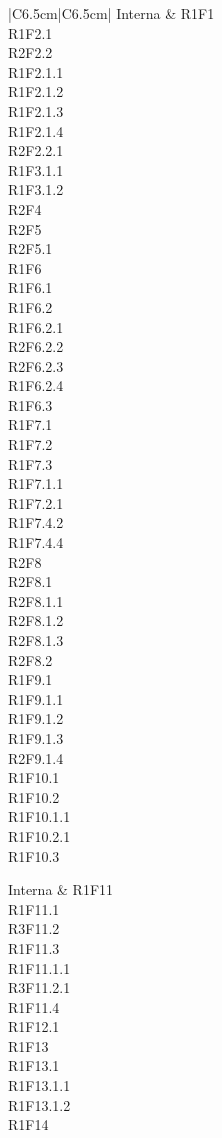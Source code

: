 \begin{longtable}{|C{6.5cm}|C{6.5cm}|}
	Interna &
	\centering
	R1F1\\
	R1F2.1 \\
	R2F2.2\\
	R1F2.1.1\\
	R1F2.1.2\\
	R1F2.1.3\\
	R1F2.1.4\\
	R2F2.2.1\\
	R1F3.1.1\\
	R1F3.1.2\\
	R2F4\\
	R2F5\\
	R2F5.1\\
	R1F6\\
	R1F6.1\\
	R1F6.2\\
	R1F6.2.1\\
	R2F6.2.2\\
	R2F6.2.3\\
	R1F6.2.4\\
	R1F6.3\\
	R1F7.1\\
	R1F7.2\\
	R1F7.3\\
	R1F7.1.1\\
	R1F7.2.1\\
	R1F7.4.2\\
	R1F7.4.4\\
	R2F8\\
	R2F8.1\\
	R2F8.1.1\\
	R2F8.1.2\\
	R2F8.1.3\\
	R2F8.2\\
	R1F9.1\\
	R1F9.1.1\\
	R1F9.1.2\\
	R1F9.1.3\\
	R2F9.1.4\\
	R1F10.1\\
	R1F10.2\\
	R1F10.1.1\\
	R1F10.2.1\\
	R1F10.3\\

	\tabularnewline

	Interna &
	\centering
	R1F11\\
	R1F11.1\\
	R3F11.2\\
	R1F11.3\\
	R1F11.1.1\\
	R3F11.2.1\\
	R1F11.4\\
	R1F12.1\\
	R1F13\\
	R1F13.1\\
	R1F13.1.1\\
	R1F13.1.2\\
	R1F14\\


\end{longtable}
